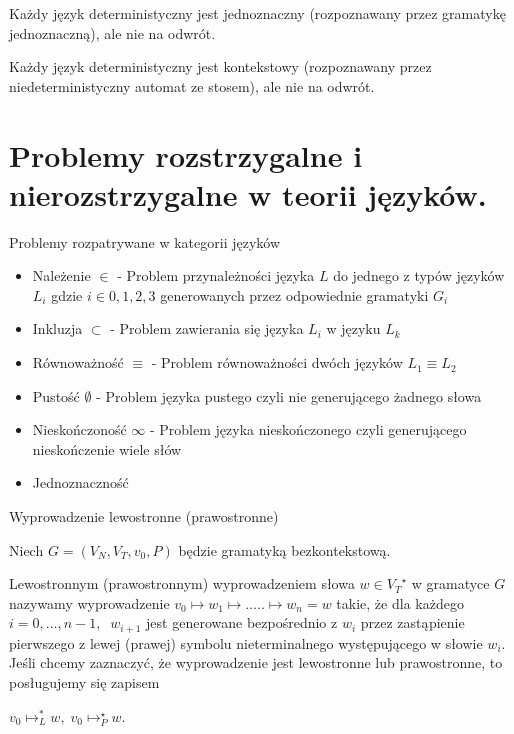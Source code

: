 \documentclass[main.tex]{subfiles}
\begin{document}
    \begin{theorem}
        Każdy język deterministyczny jest jednoznaczny (rozpoznawany przez gramatykę jednoznaczną), ale nie na odwrót.
    \end{theorem}

    \begin{theorem}
        Każdy język deterministyczny jest kontekstowy (rozpoznawany przez niedeterministyczny automat ze stosem), ale nie na odwrót.
    \end{theorem}

    \newpage

    \section{Problemy rozstrzygalne i nierozstrzygalne w teorii języków.}

    Problemy rozpatrywane w kategorii języków
    \begin{itemize}
        \item Należenie $\in$ - Problem przynależności języka $L$ do jednego z typów języków $L_i$ gdzie $i \in {0,1,2,3}$ generowanych przez odpowiednie gramatyki  $G_i$
        \item Inkluzja $\subset$ - Problem zawierania się języka $L_i$ w języku $L_k$
        \item Równoważność $\equiv$ - Problem równoważności dwóch języków $L_1 \equiv L_2$
        \item Pustość $\emptyset$ - Problem języka pustego czyli nie generującego żadnego słowa
        \item Nieskończoność $\infty$ - Problem języka nieskończonego czyli generującego nieskończenie wiele słów
        \item Jednoznaczność
    \end{itemize}

    \begin{definition}
        Wyprowadzenie lewostronne (prawostronne)

        Niech $G = (V_N,V_T,v_0,P)$ będzie gramatyką bezkontekstową.

        Lewostronnym (prawostronnym) wyprowadzeniem słowa $w \in {V_T}^\star$ w gramatyce $G$ nazywamy wyprowadzenie
        $v_0 \mapsto w_1 \mapsto \ldots.. \mapsto w_n = w$
        takie, że dla każdego $i=0,\ldots,n-1, \;\; w_{i+1}$ jest generowane bezpośrednio z $w_i$ przez zastąpienie pierwszego z lewej (prawej) symbolu nieterminalnego występującego w słowie $w_i$.
        Jeśli chcemy zaznaczyć, że wyprowadzenie jest lewostronne lub prawostronne, to posługujemy się zapisem

        $v_{0}\mapsto_{L}^{*}w,\; v_{0}\mapsto_{P}^{\star}w$.
    \end{definition}
\end{document}
